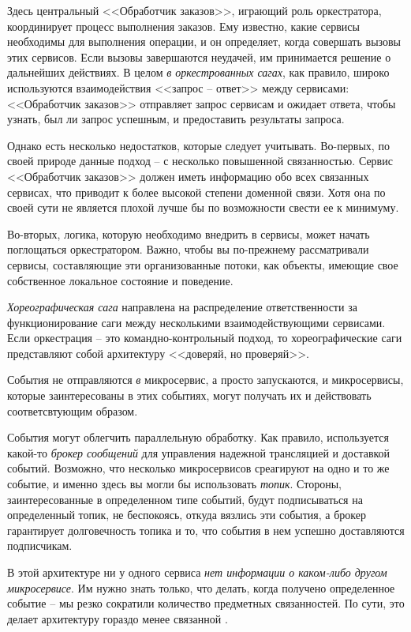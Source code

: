 \documentclass[%
	11pt,
	a4paper,
	utf8,
		]{article}
\begin{document}
Здесь центральный <<Обработчик заказов>>, играющий роль оркестратора, координирует процесс выполнения заказов. Ему известно, какие сервисы необходимы для выполнения операции, и он определяет, когда совершать вызовы этих сервисов. Если вызовы завершаются неудачей, им принимается решение о дальнейших действиях. В целом \emph{\color{blue}в оркестрованных сагах}, как правило, широко используются {\color{blue}взаимодействия <<запрос -- ответ>> между сервисами}: <<Обработчик заказов>> отправляет запрос сервисам и ожидает ответа, чтобы узнать, был ли запрос успешным, и предоставить результаты запроса.

Однако есть несколько недостатков, которые следует учитывать. Во-первых, по своей природе данные подход -- с несколько повышенной связанностью. Сервис <<Обработчик заказов>> должен иметь информацию обо всех связанных сервисах, что приводит к более высокой степени доменной связи. Хотя она по своей сути не является плохой лучше бы по возможности свести ее к минимуму.

Во-вторых, логика, которую необходимо внедрить в сервисы, может начать поглощаться оркестратором. Важно, чтобы вы по-прежнему рассматривали сервисы, составляющие эти организованные потоки, как объекты, имеющие свое собственное локальное состояние и поведение.

\emph{Хореографическая сага} направлена на распределение ответственности за функционирование саги между несколькими взаимодействующими сервисами. Если оркестрация -- это командно-контрольный подход, то хореографические саги представляют собой архитектуру <<доверяй, но проверяй>>.

События не отправляются \emph{в} микросервис, а просто запускаются, и микросервисы, которые заинтересованы в этих событиях, могут получать их и действовать соответсвтующим образом. 

События могут облегчить параллельную обработку. Как правило, используется какой-то \emph{брокер сообщений} для управления надежной трансляцией и доставкой событий. Возможно, что несколько микросервисов среагируют на одно и то же событие, и именно здесь вы могли бы использовать \emph{топик}. Стороны, заинтересованные в определенном типе событий, будут подписываться на определенный топик, не беспокоясь, откуда вязлись эти события, а брокер гарантирует долговечность топика и то, что события в нем успешно доставляются подписчикам.

В этой архитектуре ни у одного сервиса \emph{\color{blue}нет информации о каком-либо другом микросервисе}. Им нужно знать только, что делать, когда получено определенное событие -- мы резко сократили количество предметных связанностей. По сути, это делает архитектуру гораздо менее связанной \cite[]{microservices-2024}.
\end{document}
